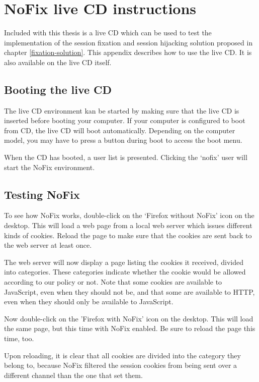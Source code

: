 \chapter{NoFix live CD instructions}\label{manual}%

Included with this thesis is a live CD which can be used to test the implementation of the session fixation and session hijacking solution proposed in chapter \ref{fixation-solution}. This appendix describes how to use the live CD. It is also available on the live CD itself.

\section{Booting the live CD}

The live CD environment kan be started by making sure that the live CD is inserted before booting your computer. If your computer is configured to boot from CD, the live CD will boot automatically. Depending on the computer model, you may have to press a button during boot to access the boot menu.

When the CD has booted, a user list is presented. Clicking the `nofix' user will start the NoFix environment.

\section{Testing NoFix}

To see how NoFix works, double-click on the `Firefox without NoFix' icon on the desktop. This will load a web page from a local web server which issues different kinds of cookies. Reload the page to make sure that the cookies are sent back to the web server at least once.

The web server will now display a page listing the cookies it received, divided into categories. These categories indicate whether the cookie would be allowed according to our policy or not. Note that some cookies are available to JavaScript, even when they should not be, and that some are available to HTTP, even when they should only be available to JavaScript.

Now double-click on the 'Firefox with NoFix' icon on the desktop. This will load the same page, but this time with NoFix enabled. Be sure to reload the page this time, too.

Upon reloading, it is clear that all cookies are divided into the category they belong to, because NoFix filtered the session cookies from being sent over a different channel than the one that set them.

